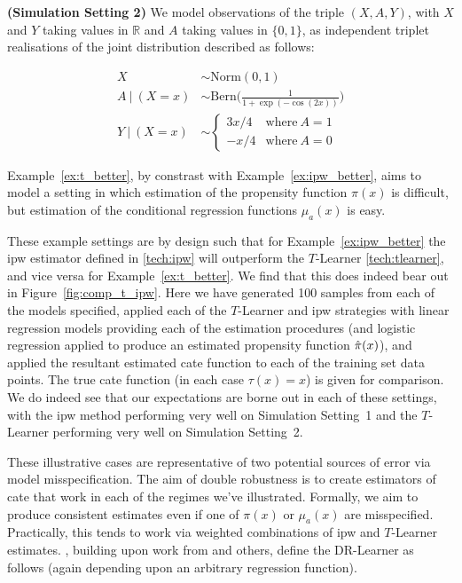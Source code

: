 \documentclass[../thesis.tex]{subfiles}
\begin{document}
\begin{example}{\textbf{(Simulation Setting 2)}} \label{ex:t_better}
We model observations of the triple $(X, A, Y)$, with $X$ and $Y$ taking values in $\mathbb{R}$ and $A$ taking values in $\{0,1\}$, as independent triplet realisations of the joint distribution described as follows:

\begin{align*}
X  & \sim \mathrm{Norm}(0, 1) \\    
A \ | \ (X = x) & \sim \mathrm{Bern}\Big(\frac{1}{1 + \exp(-\cos(2x))}\Big) \\ 
Y \ | \ (X = x) & \sim \begin{cases}
      3x/4 & \text{where} \ A = 1\\
      -x/4 & \text{where} \ A = 0
    \end{cases}
\end{align*}
\end{example}

Example~\ref{ex:t_better}, by constrast with Example~\ref{ex:ipw_better}, aims to model a setting in which estimation of the propensity function $\pi(x)$ is difficult, but estimation of the conditional regression functions $\mu_a(x)$ is easy. 

These example settings are by design such that for Example~\ref{ex:ipw_better} the \gls{ipw} estimator defined in \eqref{tech:ipw} will outperform the $T$-Learner \eqref{tech:tlearner}, and vice versa for Example~\ref{ex:t_better}. We find that this does indeed bear out in Figure~\ref{fig:comp_t_ipw}. Here we have generated 100 samples from each of the models specified, applied each of the $T$-Learner and \gls{ipw} strategies with linear regression models providing each of the estimation procedures (and logistic regression applied to produce an estimated propensity function $\hat{\pi}(x)$), and applied the resultant estimated \gls{cate} function to each of the training set data points. The true \gls{cate} function (in each case $\tau(x) = x$) is given for comparison. We do indeed see that our expectations are borne out in each of these settings, with the \gls{ipw} method performing very well on Simulation Setting~1 and the $T$-Learner performing very well on Simulation Setting~2.

These illustrative cases are representative of two potential sources of error via model misspecification. The aim of double robustness is to create estimators of \gls{cate} that work in each of the regimes we've illustrated. Formally, we aim to produce consistent estimates even if one of $\pi(x)$ or $\mu_a(x)$ are misspecified. Practically, this tends to work via weighted combinations of \gls{ipw} and $T$-Learner estimates. \citet{kennedy_towards_2022}, building upon work from \citet{nie_quasi-oracle_2021} and others, define the DR-Learner as follows (again depending upon an arbitrary regression function). 
\end{document}
